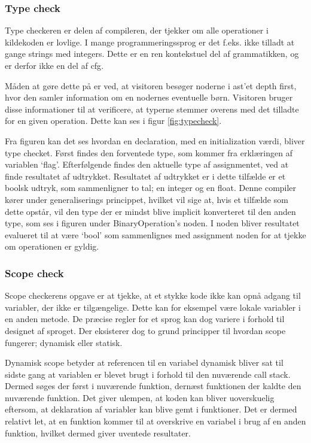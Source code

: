 \subsubsection{Type check}
    
Type checkeren er delen af compileren, der tjekker om alle operationer i kildekoden er lovlige. I mange programmeringssprog er det f.eks. ikke tilladt at gange strings med integers. Dette er en ren kontekstuel del af grammatikken, og er derfor ikke en del af \gls{cfg}.
    
Måden at gøre dette på er ved, at visitoren besøger noderne i \gls{ast}'et depth first, hvor den samler information om en nodernes eventuelle børn. Visitoren bruger disse informationer til at verificere, at typerne stemmer overens med det tilladte for en given operation. Dette kan ses i figur \ref{fig:typecheck}.
    
    
\noindent Fra figuren kan det ses hvordan en declaration, med en initialization værdi, bliver type checket. Først findes den forventede type, som kommer fra erklæringen af variablen \enquote*{flag}. Efterfølgende findes den aktuelle type af assignmentet, ved at finde resultatet af udtrykket. Resultatet af udtrykket er i dette tilfælde er et boolsk udtryk, som sammenligner to tal; en integer og en float. Denne compiler kører under generaliserings princippet, hvilket vil sige at, hvis et tilfælde som dette opstår, vil den type der er mindst blive implicit konverteret til den anden type, som ses i figuren under BinaryOperation's noden. I noden bliver resultatet evalueret til at være \enquote*{bool} som sammenlignes med assignment noden for at tjekke om operationen er gyldig.
    
\subsubsection{Scope check}
Scope checkerens opgave er at tjekke, at et stykke kode ikke kan opnå adgang til variabler, der ikke er tilgængelige. Dette kan for eksempel være lokale variabler i en anden metode. De præcise regler for et sprog kan dog variere i forhold til designet af sproget. Der eksisterer dog to grund principper til hvordan scope fungerer; dynamisk eller statisk.
    
Dynamisk scope betyder at referencen til en variabel dynamisk bliver sat til sidste gang at variablen er blevet brugt i forhold til den nuværende call stack. Dermed søges der først i nuværende funktion, dernæst funktionen der kaldte den nuværende funktion. Det giver ulempen, at koden kan bliver uoverskuelig eftersom, at deklaration af variabler kan blive gemt i funktioner. Det er dermed relativt let, at en funktion kommer til at overskrive en variabel i brug af en anden funktion, hvilket dermed giver uventede resultater.
    
